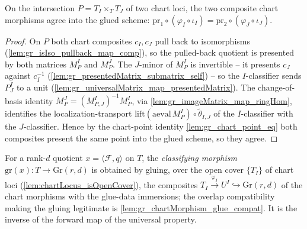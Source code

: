 \begin{lemma}
  \label{lem:gr_chartMorphism_glue_compat}
  On the intersection \(P = T_I \times_T T_J\) of two chart loci, the two composite chart
  morphisms agree into the glued scheme:
  \(\mathrm{pr}_1 \circ (\varphi_I \circ \iota_I) = \mathrm{pr}_2 \circ (\varphi_J \circ
  \iota_J)\).
\end{lemma}
\begin{proof}
    \leanok
  On \(P\) both chart composites \(c_I, c_J\) pull back to isomorphisms
  (\cref{lem:gr_isIso_pullback_map_comp}), so the pulled-back quotient is presented by both
  matrices \(M^I_P\) and \(M^J_P\). The \(J\)-minor of \(M^I_P\) is invertible -- it presents
  \(c_J\) against \(c_I^{-1}\) (\cref{lem:gr_presentedMatrix_submatrix_self}) -- so the
  \(I\)-classifier sends \(P^I_J\) to a unit
  (\cref{lem:gr_universalMatrix_map_presentedMatrix}). The change-of-basis identity
  \(M^J_P = (M^I_{P,J})^{-1} M^I_P\), via \cref{lem:gr_imageMatrix_map_ringHom}, identifies the
  localization-transport \(\mathrm{lift}(\mathrm{aeval}\,M^I_P)\circ\tilde\theta_{I,J}\) of the
  \(I\)-classifier with the \(J\)-classifier. Hence by the chart-point identity
  \cref{lem:gr_chart_point_eq} both composites present the same point into the glued scheme,
  so they agree.
\end{proof}

\begin{definition}
  \label{def:grPointOfRankQuotient}
  For a rank-\(d\) quotient \(x = \langle \mathcal{F}, q\rangle\) on \(T\), the
  \emph{classifying morphism} \(\mathrm{gr}(x) : T \to \mathrm{Gr}(r,d)\) is obtained by
  gluing, over the open cover \(\{T_I\}\) of chart loci (\cref{lem:chartLocus_isOpenCover}),
  the composites \(T_I \xrightarrow{\varphi_I} U^I \hookrightarrow \mathrm{Gr}(r,d)\) of the
  chart morphisms with the glue-data immersions; the overlap compatibility making the gluing
  legitimate is \cref{lem:gr_chartMorphism_glue_compat}. It is the inverse of the forward map
  of the universal property.
\end{definition}


